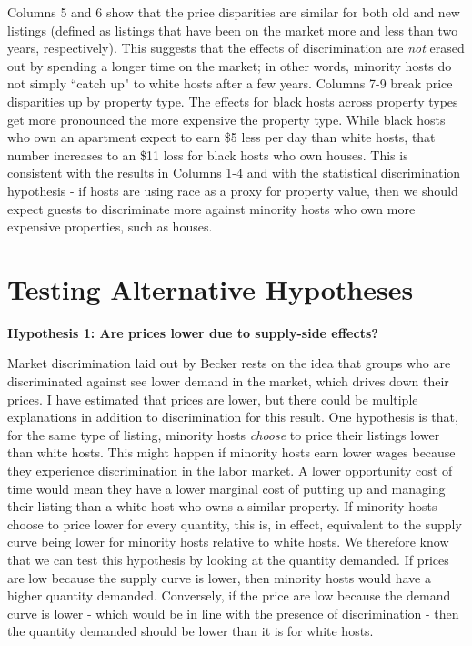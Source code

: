 \documentclass[11pt, oneside]{article}
\begin{document}
Columns 5 and 6 show that the price disparities are similar for both old and new listings (defined as listings that have been on the market more and less than two years, respectively). This suggests that the effects of discrimination are \textit{not} erased out by spending a longer time on the market; in other words, minority hosts do not simply ``catch up" to white hosts after a few years. Columns 7-9 break price disparities up by property type. The effects for black hosts across property types get more pronounced the more expensive the property type. While black hosts who own an apartment expect to earn \$5 less per day than white hosts, that number increases to an \$11 loss for black hosts who own houses. This is consistent with the results in Columns 1-4 and with the statistical discrimination hypothesis - if hosts are using race as a proxy for property value, then we should expect guests to discriminate more against minority hosts who own more expensive properties, such as houses.   


\section{Testing Alternative Hypotheses}
\textbf{Hypothesis 1: Are prices lower due to supply-side effects?}

Market discrimination laid out by Becker rests on the idea that groups who are discriminated against see lower demand in the market, which drives down their prices. I have estimated that prices are lower, but there could be multiple explanations in addition to discrimination for this result. One hypothesis is that, for the same type of listing, minority hosts \textit{choose} to price their listings lower than white hosts. This might happen if minority hosts earn lower wages because they experience discrimination in the labor market. A lower opportunity cost of time would mean they have a lower marginal cost of putting up and managing their listing than a white host who owns a similar property. If minority hosts choose to price lower for every quantity, this is, in effect, equivalent to the supply curve being lower for minority hosts relative to white hosts. We therefore know that we can test this hypothesis by looking at the quantity demanded. If prices are low because the supply curve is lower, then minority hosts would have a higher quantity demanded. Conversely, if the price are low because the demand curve is lower - which would be in line with the presence of discrimination - then the quantity demanded should be lower than it is for white hosts. 
\end{document}
